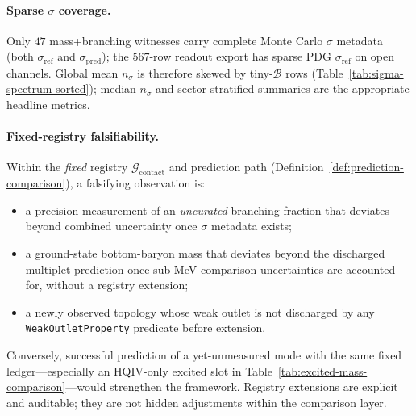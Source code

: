 \documentclass[11pt]{amsart}
\begin{document}
\paragraph{Sparse $\sigma$ coverage.}
Only $47$ mass+branching witnesses carry complete Monte Carlo $\sigma$ metadata
(both $\sigma_{\mathrm{ref}}$ and $\sigma_{\mathrm{pred}}$);
the $567$-row readout export has sparse PDG $\sigma_{\mathrm{ref}}$ on open
channels.
Global mean $n_\sigma$ is therefore skewed by tiny-$\mathcal{B}$ rows
(Table~\ref{tab:sigma-spectrum-sorted}); median $n_\sigma$ and sector-stratified
summaries are the appropriate headline metrics.

\paragraph{Fixed-registry falsifiability.}
Within the \emph{fixed} registry $\mathcal{G}_{\mathrm{contact}}$ and prediction
path (Definition~\ref{def:prediction-comparison}), a falsifying observation is:
\begin{itemize}[leftmargin=2em]
\item a precision measurement of an \emph{uncurated} branching fraction that
  deviates beyond combined uncertainty once $\sigma$ metadata exists;
\item a ground-state bottom-baryon mass that deviates beyond the discharged multiplet
  prediction once sub-MeV comparison uncertainties are accounted for, without a
  registry extension;
\item a newly observed topology whose weak outlet is not discharged by any
  \texttt{WeakOutletProperty} predicate before extension.
\end{itemize}
Conversely, successful prediction of a yet-unmeasured mode with the same fixed
ledger---especially an HQIV-only excited slot in
Table~\ref{tab:excited-mass-comparison}---would strengthen the framework.
Registry extensions are explicit and auditable; they are not hidden adjustments
within the comparison layer.
\end{document}
